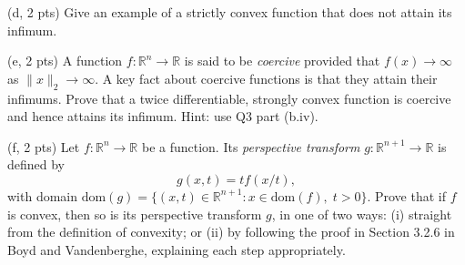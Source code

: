 \documentclass{article}
\theoremstyle{remark}
\theoremstyle{definition}
\def\R{\mathbb{R}}
\def\dom{\mathrm{dom}}
\begin{document}
\bigskip
\noindent
(d, 2 pts) Give an example of a strictly convex function that does not attain 
its infimum.

\bigskip
\noindent
(e, 2 pts) A function $f : \R^n \to \R$ is said to be {\it coercive} provided
that $f(x) \to \infty$ as $\|x\|_2 \to \infty$.  A key fact about coercive
functions is that they attain their infimums.  Prove that a twice
differentiable, strongly convex function is coercive and hence attains its
infimum. Hint: use Q3 part (b.iv).  

\bigskip
\noindent
(f, 2 pts) Let $f : \R^n \to \R$ be a function. Its {\it perspective
transform} $g : \R^{n+1} \to \R$ is defined by
$$
g(x,t) = t f(x/t),
$$
with domain $\dom(g)=\{(x,t) \in \R^{n+1} : x \in \dom(f), \; t > 0\}$.
Prove that if $f$ is convex, then so is its perspective transform $g$, in one of
two ways: (i) straight from the definition of convexity; or (ii) by following the
proof in Section 3.2.6 in Boyd and Vandenberghe, explaining each step
appropriately. 



\end{document}
